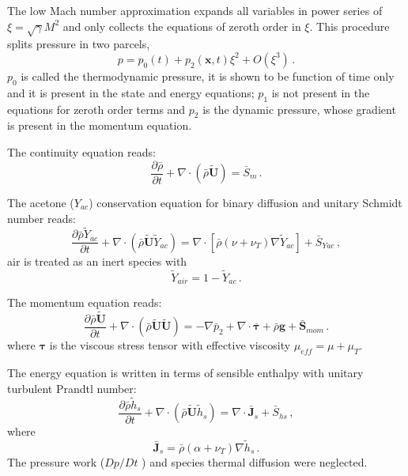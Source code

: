 \documentclass[preprint,12pt,review]{elsarticle}
\newcommand{\bv}[1]{\mathbf{#1}}
\begin{document}
The low Mach number approximation expands all variables in power series of $\xi=\sqrt{\gamma}M^2$ and only collects the equations of zeroth order in $\xi$. This procedure splits pressure in two parcels,
\begin{equation}
p = p_{0}(t) + p_{2}(\bv{x},t)\xi^2 + O\left( \xi^3 \right) \, .
\end{equation}
$p_0$ is called the thermodynamic pressure, it is shown to be function of time only and it is present in the state and energy equations; $p_1$ is not present in the equations for zeroth order terms and $p_2$ is the dynamic pressure, whose gradient is present in the momentum equation.

The continuity equation reads:
\begin{equation}\label{av: mass}
  \frac{\partial \bar{\rho}}{\partial t} + \nabla \cdot \left( \bar{\rho}
\tilde{\bv{U}} \right) =  \bar{S}_m \, .
\end{equation}

The acetone ($Y_{ac}$) conservation equation for binary diffusion and unitary Schmidt number reads:
\begin{equation}\label{av: species}
 \frac{\partial \bar{\rho} \tilde{Y}_{ac} }{\partial t} + \nabla
\cdot\left(\bar{\rho} \tilde{\bv{U}} \tilde{Y}_{ac} \right) = \nabla \cdot \left[ \bar{\rho} \left( \nu + \nu_T \right)
\nabla \tilde{Y}_{ac} \right] +\bar{S}_{Yac} \, ,
\end{equation}
air is treated as an inert species with
\begin{equation}
\tilde{Y}_{air} = 1- \tilde{Y}_{ac} \, .
\end{equation}

The momentum equation reads:
\begin{equation}\label{av: momentum}
 \frac{\partial \bar{\rho} \tilde{\bv{U}} }{\partial t} + \nabla \cdot \left(
\bar{\rho} \tilde{\bv{U}} \tilde{\bv{U}} \right) = -\nabla \bar{p}_2 +  
 \nabla \cdot\overline{\bv{\tau}} +\bar{\rho}\bv{g}+\bar{\bv{S}}_{mom}  \, .
\end{equation}
where $\bv{\tau}$ is the viscous stress tensor with effective viscosity $\mu_{eff}=\mu+\mu_T$. 

The energy equation is written in terms of sensible enthalpy with unitary turbulent Prandtl number:
\begin{equation}\label{av: enthalpy}
\frac{\partial \bar{\rho} \tilde{h}_{s}}{\partial t} + \nabla \cdot
\left(\bar{\rho} \tilde{\bv{U}} \tilde{h}_{s} \right) = \nabla \cdot \bar{\bv{J}}_s + \bar{S}_{hs}\, ,
\end{equation} where 
\begin{equation}
\bar{\bv{J}}_s =  \bar{\rho} \left( \alpha + \nu_T\right) \nabla \tilde{h}_s \, .
\end{equation}
The pressure work ($Dp/Dt$ ) and species thermal diffusion were neglected.
\end{document}
